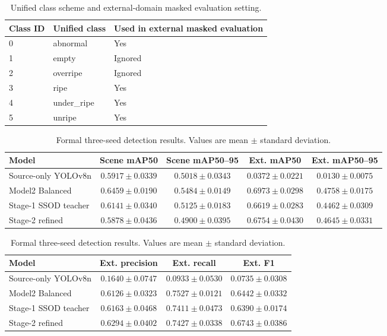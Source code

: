 ﻿\documentclass[12pt]{article}
\begin{document}
\begin{table}[h]
\centering
\caption{Unified class scheme and external-domain masked evaluation setting.}
\label{tab:class_scheme}
\begin{tabular}{lll}
\toprule
Class ID & Unified class & Used in external masked evaluation \\
\midrule
0 & abnormal & Yes \\
1 & empty & Ignored \\
2 & overripe & Ignored \\
3 & ripe & Yes \\
4 & under\_ripe & Yes \\
5 & unripe & Yes \\
\bottomrule
\end{tabular}
\end{table}

\begin{table}[h]
\centering
\caption{Formal three-seed detection results. Values are mean $\pm$ standard deviation.}
\label{tab:formal_results}
\footnotesize
\setlength{\tabcolsep}{3pt}
\begin{tabular}{lcccc}
\toprule
Model & Scene mAP50 & Scene mAP50--95 & Ext. mAP50 & Ext. mAP50--95 \\
\midrule
Source-only YOLOv8n & $0.5917 \pm 0.0339$ & $0.5018 \pm 0.0343$ & $0.0372 \pm 0.0221$ & $0.0130 \pm 0.0075$ \\
Model2 Balanced & $0.6459 \pm 0.0190$ & $0.5484 \pm 0.0149$ & $0.6973 \pm 0.0298$ & $0.4758 \pm 0.0175$ \\
Stage-1 SSOD teacher & $0.6141 \pm 0.0340$ & $0.5125 \pm 0.0183$ & $0.6619 \pm 0.0283$ & $0.4462 \pm 0.0309$ \\
Stage-2 refined & $0.5878 \pm 0.0436$ & $0.4900 \pm 0.0395$ & $0.6754 \pm 0.0430$ & $0.4645 \pm 0.0331$ \\
\bottomrule
\end{tabular}

\vspace{0.5em}
\begin{tabular}{lccc}
\toprule
Model & Ext. precision & Ext. recall & Ext. F1 \\
\midrule
Source-only YOLOv8n & $0.1640 \pm 0.0747$ & $0.0933 \pm 0.0530$ & $0.0735 \pm 0.0308$ \\
Model2 Balanced & $0.6126 \pm 0.0323$ & $0.7527 \pm 0.0121$ & $0.6442 \pm 0.0332$ \\
Stage-1 SSOD teacher & $0.6163 \pm 0.0468$ & $0.7411 \pm 0.0473$ & $0.6390 \pm 0.0174$ \\
Stage-2 refined & $0.6294 \pm 0.0402$ & $0.7427 \pm 0.0338$ & $0.6743 \pm 0.0386$ \\
\bottomrule
\end{tabular}
\end{table}
\end{document}
